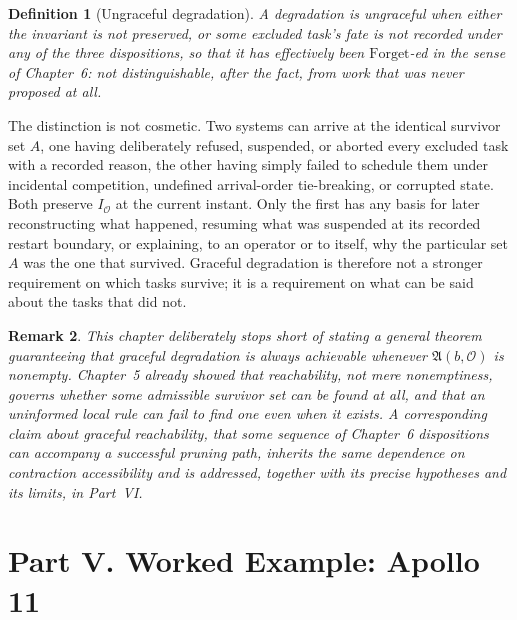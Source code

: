 \documentclass[11pt]{report}
\newtheorem{definition}{Definition}[chapter]
\newtheorem{remark}[definition]{Remark}
\newcommand{\Forget}{\mathrm{Forget}}
\begin{document}
\begin{definition}[Ungraceful degradation]
A degradation is ungraceful when either the invariant is not preserved, or some excluded task's fate is not recorded under any of the three dispositions, so that it has effectively been $\Forget$-ed in the sense of Chapter~6: not distinguishable, after the fact, from work that was never proposed at all.
\end{definition}

The distinction is not cosmetic. Two systems can arrive at the identical survivor set $A$, one having deliberately refused, suspended, or aborted every excluded task with a recorded reason, the other having simply failed to schedule them under incidental competition, undefined arrival-order tie-breaking, or corrupted state. Both preserve $I_{\mathcal O}$ at the current instant. Only the first has any basis for later reconstructing what happened, resuming what was suspended at its recorded restart boundary, or explaining, to an operator or to itself, why the particular set $A$ was the one that survived. Graceful degradation is therefore not a stronger requirement on which tasks survive; it is a requirement on what can be said about the tasks that did not.

\begin{remark}
This chapter deliberately stops short of stating a general theorem guaranteeing that graceful degradation is always achievable whenever $\mathfrak A(b, \mathcal O)$ is nonempty. Chapter~5 already showed that reachability, not mere nonemptiness, governs whether some admissible survivor set can be found at all, and that an uninformed local rule can fail to find one even when it exists. A corresponding claim about \emph{graceful} reachability, that some sequence of Chapter~6 dispositions can accompany a successful pruning path, inherits the same dependence on contraction accessibility and is addressed, together with its precise hypotheses and its limits, in Part~VI.
\end{remark}

\part*{Part V. Worked Example: Apollo 11}
\end{document}
